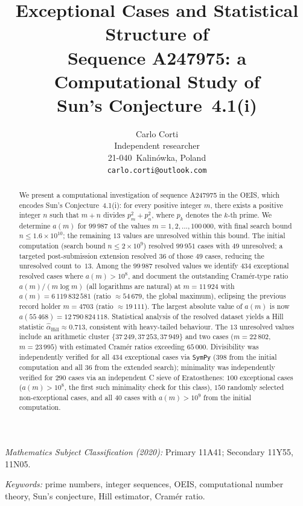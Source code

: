 \documentclass[12pt]{article}
\title{Exceptional Cases and Statistical Structure of\\
	Sequence A247975: a Computational Study of\\
	Sun's Conjecture~4.1(i)}
\author{Carlo Corti\\[4pt]
	\small Independent researcher\\
	\small 21-040~Kalin\'owka, Poland\\
	\small \texttt{carlo.corti@outlook.com}}
\date{}
\begin{document}
	
	\maketitle
	
	\noindent
	\textit{Mathematics Subject Classification (2020):}
	Primary 11A41; Secondary 11Y55, 11N05.
	
	\noindent
	\textit{Keywords:}
	prime numbers, integer sequences, OEIS, computational number theory,
	Sun's conjecture, Hill estimator, Cram\'er ratio.
	
	\begin{abstract}
		We present a computational investigation of sequence A247975 in the
		OEIS, which encodes Sun's Conjecture~4.1(i): for every positive integer
		$m$, there exists a positive integer $n$ such that $m+n$ divides
		$p_m^2 + p_n^2$, where $p_k$ denotes the $k$-th prime.
		We determine $a(m)$ for $99\,987$ of the values $m = 1, 2, \ldots,
		100\,000$, with final search bound $n \leq 1.6 \times 10^{10}$;
		the remaining $13$ values are unresolved within this bound.
		The initial computation (search bound $n \leq 2 \times 10^9$)
		resolved $99\,951$ cases with $49$ unresolved; a targeted
		post-submission extension resolved $36$ of those $49$ cases,
		reducing the unresolved count to~$13$.
		Among the $99\,987$ resolved values we identify $434$ exceptional
		resolved cases where $a(m) > 10^8$, and document the outstanding
		Cram\'er-type ratio $a(m)/(m \log m)$
		(all logarithms are natural) at $m = 11\,924$ with
		$a(m) = 6\,119\,832\,581$ (ratio $\approx 54\,679$, the global
		maximum), eclipsing the previous record holder $m = 4703$
		(ratio $\approx 19\,111$).
		The largest absolute value of $a(m)$ is now
		$a(55\,468) = 12\,790\,824\,118$.
		Statistical analysis of the resolved dataset yields a Hill statistic
		$\hat{\alpha}_{\mathrm{Hill}} \approx 0.713$, consistent with
		heavy-tailed behaviour.
		The $13$ unresolved values include an arithmetic cluster
		$\{37\,249, 37\,253, 37\,949\}$ and two cases ($m = 22\,802$,
		$m = 23\,995$) with estimated Cram\'er ratios exceeding $65\,000$.
		Divisibility was independently verified for all $434$ exceptional
		cases via \texttt{SymPy} ($398$ from the initial computation and
		all $36$ from the extended search); minimality was independently
		verified for $290$ cases
		via an independent C sieve of Eratosthenes: $100$ exceptional cases
		($a(m) > 10^8$, the first such minimality check for this class),
		$150$ randomly selected non-exceptional cases, and all $40$ cases with
		$a(m) > 10^9$ from the initial computation.
	\end{abstract}
	
\end{document}
